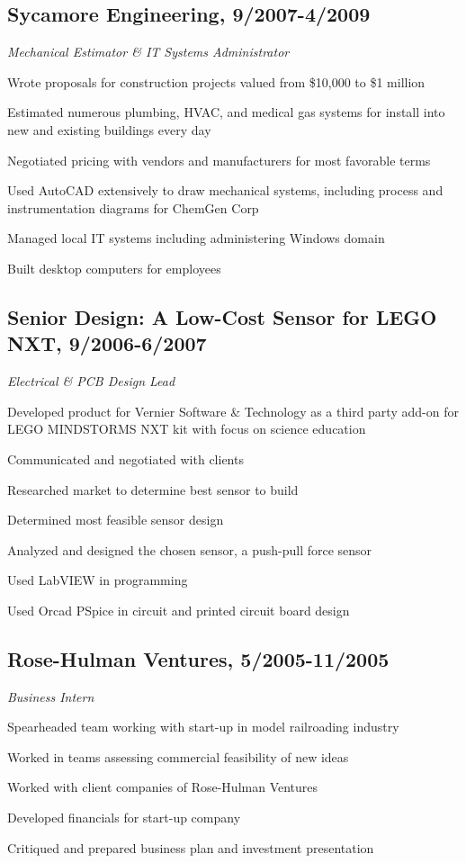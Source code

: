 \documentclass[11pt] {article}
\begin{document}
\subsection*{Sycamore Engineering, 9/2007-4/2009} 
\textit{Mechanical Estimator \& IT Systems Administrator}
\begin{itemize*}
\item Wrote proposals for construction projects valued from \$10,000 to \$1 million
\item Estimated numerous plumbing, HVAC, and medical gas systems for install into new and existing buildings every day
\item Negotiated pricing with vendors and manufacturers for most favorable terms
\item Used AutoCAD extensively to draw mechanical systems, including process and instrumentation diagrams for ChemGen Corp
\item Managed local IT systems including administering Windows domain
\item Built desktop computers for employees
\end{itemize*}

\subsection*{Senior Design: A Low-Cost Sensor for LEGO NXT, 9/2006-6/2007}
\textit{Electrical \& PCB Design Lead}
\begin{itemize*}
\item Developed product for Vernier Software \& Technology as a third party add-on for LEGO MINDSTORMS NXT kit with focus on science education
\item Communicated and negotiated with clients
\item Researched market to determine best sensor to build
\item Determined most feasible sensor design
\item Analyzed and designed the chosen sensor, a push-pull force sensor
\item Used LabVIEW in programming
\item Used Orcad PSpice in circuit and printed circuit board design
\end{itemize*}

\subsection*{Rose-Hulman Ventures, 5/2005-11/2005}
\textit{Business Intern}
\begin{itemize*}
\item Spearheaded team working with start-up in model railroading industry
\item Worked in teams assessing commercial feasibility of new ideas
\item Worked with client companies of Rose-Hulman Ventures
\item Developed financials for start-up company
\item Critiqued and prepared business plan and investment presentation
\end{itemize*}
\end{document}
